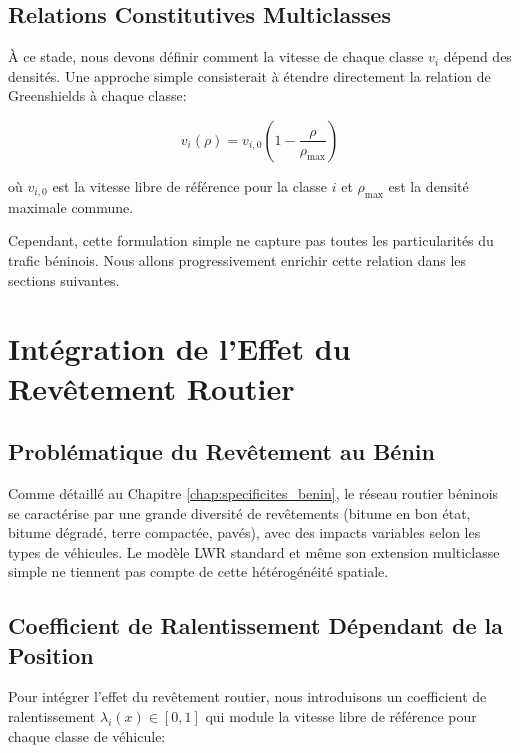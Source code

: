 \subsection{Relations Constitutives Multiclasses}\label{subsec:relations_constitutives}

À ce stade, nous devons définir comment la vitesse de chaque classe $v_i$ dépend des densités. Une approche simple consisterait à étendre directement la relation de Greenshields à chaque classe:

\begin{equation}
v_i(\rho) = v_{i,0}\left(1 - \frac{\rho}{\rho_{\max}}\right)
\label{eq:vitesse_multiclasse_simple}
\end{equation}

où $v_{i,0}$ est la vitesse libre de référence pour la classe $i$ et $\rho_{\max}$ est la densité maximale commune.

Cependant, cette formulation simple ne capture pas toutes les particularités du trafic béninois. Nous allons progressivement enrichir cette relation dans les sections suivantes.

\section{Intégration de l'Effet du Revêtement Routier}
\label{sec:effet_revetement}

\subsection{Problématique du Revêtement au Bénin}
\label{subsec:problematique_revetement}

Comme détaillé au Chapitre \ref{chap:specificites_benin}, le réseau routier béninois se caractérise par une grande diversité de revêtements (bitume en bon état, bitume dégradé, terre compactée, pavés), avec des impacts variables selon les types de véhicules. Le modèle LWR standard et même son extension multiclasse simple ne tiennent pas compte de cette hétérogénéité spatiale.

\subsection{Coefficient de Ralentissement Dépendant de la Position}
\label{subsec:coefficient_ralentissement}

Pour intégrer l'effet du revêtement routier, nous introduisons un coefficient de ralentissement $\lambda_i(x) \in [0,1]$ qui module la vitesse libre de référence pour chaque classe de véhicule:

